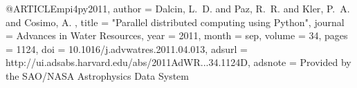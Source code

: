 
@ARTICLE{mpi4py2011,
   author = {{Dalcin}, L.~D. and {Paz}, R.~R. and {Kler}, P.~A. and {Cosimo}, A.
	},
    title = "{Parallel distributed computing using Python}",
  journal = {Advances in Water Resources},
     year = 2011,
    month = sep,
   volume = 34,
    pages = {1124},
      doi = {10.1016/j.advwatres.2011.04.013},
   adsurl = {http://ui.adsabs.harvard.edu/abs/2011AdWR...34.1124D},
  adsnote = {Provided by the SAO/NASA Astrophysics Data System}
}
